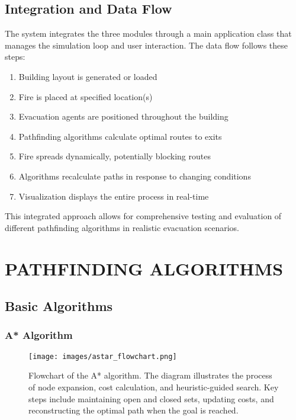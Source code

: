 \documentclass[11pt,a4paper]{report}
\begin{document}
\section{Integration and Data Flow}
The system integrates the three modules through a main application class that manages the simulation loop and user interaction. The data flow follows these steps:

\begin{enumerate}
    \item Building layout is generated or loaded
    \item Fire is placed at specified location(s)
    \item Evacuation agents are positioned throughout the building
    \item Pathfinding algorithms calculate optimal routes to exits
    \item Fire spreads dynamically, potentially blocking routes
    \item Algorithms recalculate paths in response to changing conditions
    \item Visualization displays the entire process in real-time
\end{enumerate}

This integrated approach allows for comprehensive testing and evaluation of different pathfinding algorithms in realistic evacuation scenarios.

\chapter{PATHFINDING ALGORITHMS}

\section{Basic Algorithms}

\subsection{A* Algorithm}
\begin{figure}[H]
    \centering
    \texttt{[image: images/astar\_flowchart.png]}
    \caption{Flowchart of the A* algorithm. The diagram illustrates the process of node expansion, cost calculation, and heuristic-guided search. Key steps include maintaining open and closed sets, updating costs, and reconstructing the optimal path when the goal is reached.}
    \label{fig:astar_flowchart}
\end{figure}
\end{document}

